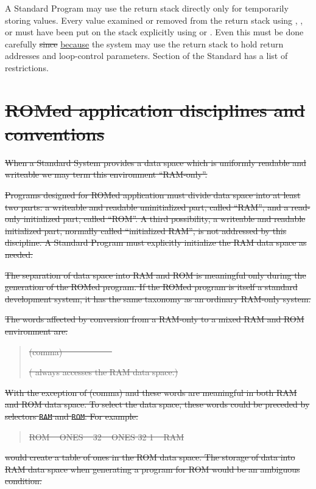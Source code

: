 A Standard Program may use the return stack directly only for
temporarily storing values. Every value examined or removed from the
return stack using , , or  must have been
put on the stack explicitly using  or . Even this
must be done carefully \sout{since} \uline{because} the system may use the return stack to
hold return addresses and loop-control parameters. Section
 of the Standard has a
list of restrictions.


\section[ROMed application disciplines and conventions]{\sout{ROMed application disciplines and conventions}} %

\sout{%
When a Standard System provides a data space which is uniformly
readable and writeable we may term this environment ``RAM-only''.}

\sout{%
Programs designed for ROMed application must divide data space into
at least two parts: a writeable and readable uninitialized part,
called ``RAM'', and a read-only initialized part, called ``ROM''.
A third possibility, a writeable and readable initialized part,
normally called ``initialized RAM'', is not addressed by this
discipline. A Standard Program must explicitly initialize the RAM
data space as needed.}

\sout{%
The separation of data space into RAM and ROM is meaningful only
during the generation of the ROMed program. If the ROMed program is
itself a standard development system, it has the same taxonomy as an
ordinary RAM-only system.}

\sout{%
The words affected by conversion from a RAM-only to a mixed RAM and
ROM environment are:}
\begin{quote}
	\sout{\word{,} (comma) ~  ~  ~  ~
	 ~  ~  ~ }

	\sout{( always accesses the RAM data space.)}
\end{quote}
\sout{%
With the exception of \word{,} (comma) and  these words are
meaningful in both RAM and ROM data space. To select the data space,
these words could be preceded by selectors \texttt{RAM} and
\texttt{ROM}. For example:}
\begin{quote}\ttfamily
	\sout{ROM ~  ONES ~ 32  ~ ONES 32 1  ~ RAM}
\end{quote}
\sout{%
would create a table of ones in the ROM data space. The storage of
data into RAM data space when generating a program for ROM would be
an ambiguous condition.}

